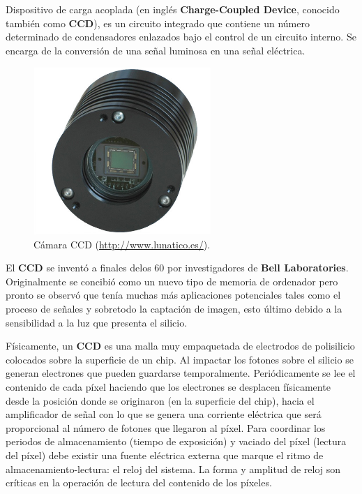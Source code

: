 Dispositivo de carga acoplada (en inglés \textbf{Charge-Coupled Device}, conocido también como \textbf{CCD}), es un circuito integrado que contiene un número determinado de condensadores enlazados bajo el control de un circuito interno. Se encarga de la conversión de una señal luminosa en una señal eléctrica.

\bigskip
\begin{figure}[!ht]
	\begin{center}
		\includegraphics[width=0.6\textwidth]{../images/ccd.jpg}
		\caption[Cámara CCD]{Cámara CCD (\href{http://www.lunatico.es/}{http://www.lunatico.es/}).}
		\label{fig:ccd}
	\end{center}
\end{figure}

\bigskip
El \textbf{CCD} se inventó a finales delos 60 por investigadores de \textbf{Bell Laboratories}. Originalmente se concibió como un nuevo tipo de memoria de ordenador pero pronto se observó que tenía muchas más aplicaciones potenciales tales como el proceso de señales y sobretodo la captación de imagen, esto último debido a la sensibilidad a la luz que presenta el silicio.

\bigskip
Físicamente, un \textbf{CCD} es una malla muy empaquetada de electrodos de polisilicio colocados sobre la superficie de un chip. Al impactar los fotones sobre el silicio se generan electrones que pueden guardarse temporalmente. Periódicamente se lee el contenido de cada píxel haciendo que los electrones se desplacen físicamente desde la posición donde se originaron (en la superficie del chip), hacia el amplificador de señal con lo que se genera una corriente eléctrica que será proporcional al número de fotones que llegaron al píxel. Para coordinar los periodos de almacenamiento (tiempo de exposición) y vaciado del píxel (lectura del píxel) debe existir una fuente eléctrica externa que marque el ritmo de almacenamiento-lectura: el reloj del sistema. La forma y amplitud de reloj son críticas en la operación de lectura del contenido de los píxeles.



